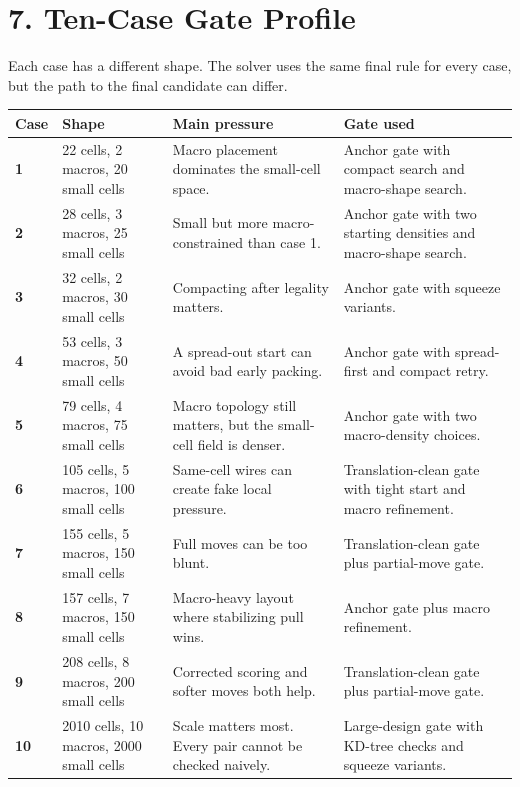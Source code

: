 \documentclass[11pt]{article}
\begin{document}
\newpage

\section{7. Ten-Case Gate Profile}

Each case has a different shape. The solver uses the same final rule for every case, but the path to the final candidate can differ.

\begin{center}
\scriptsize
\begin{tabularx}{\textwidth}{>{\bfseries}p{}p{}p{}X}
\toprule
Case & Shape & Main pressure & Gate used \\
\midrule
1 & 22 cells, 2 macros, 20 small cells & Macro placement dominates the small-cell space. & Anchor gate with compact search and macro-shape search. \\
2 & 28 cells, 3 macros, 25 small cells & Small but more macro-constrained than case 1. & Anchor gate with two starting densities and macro-shape search. \\
3 & 32 cells, 2 macros, 30 small cells & Compacting after legality matters. & Anchor gate with squeeze variants. \\
4 & 53 cells, 3 macros, 50 small cells & A spread-out start can avoid bad early packing. & Anchor gate with spread-first and compact retry. \\
5 & 79 cells, 4 macros, 75 small cells & Macro topology still matters, but the small-cell field is denser. & Anchor gate with two macro-density choices. \\
6 & 105 cells, 5 macros, 100 small cells & Same-cell wires can create fake local pressure. & Translation-clean gate with tight start and macro refinement. \\
7 & 155 cells, 5 macros, 150 small cells & Full moves can be too blunt. & Translation-clean gate plus partial-move gate. \\
8 & 157 cells, 7 macros, 150 small cells & Macro-heavy layout where stabilizing pull wins. & Anchor gate plus macro refinement. \\
9 & 208 cells, 8 macros, 200 small cells & Corrected scoring and softer moves both help. & Translation-clean gate plus partial-move gate. \\
10 & 2010 cells, 10 macros, 2000 small cells & Scale matters most. Every pair cannot be checked naively. & Large-design gate with KD-tree checks and squeeze variants. \\
\bottomrule
\end{tabularx}
\end{center}
\end{document}
